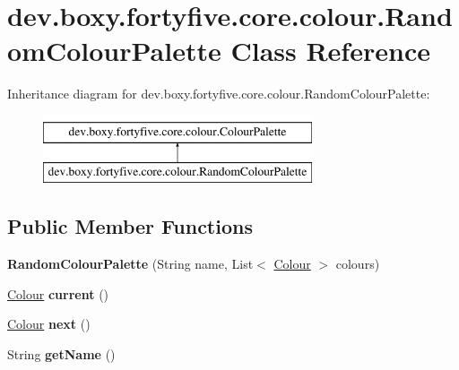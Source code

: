 \hypertarget{classdev_1_1boxy_1_1fortyfive_1_1core_1_1colour_1_1_random_colour_palette}{
\section{dev.boxy.fortyfive.core.colour.RandomColourPalette Class Reference}
\label{df/d90/classdev_1_1boxy_1_1fortyfive_1_1core_1_1colour_1_1_random_colour_palette}
}
Inheritance diagram for dev.boxy.fortyfive.core.colour.RandomColourPalette:\begin{figure}[H]
\begin{center}
\leavevmode
\includegraphics[height=2.000000cm]{df/d90/classdev_1_1boxy_1_1fortyfive_1_1core_1_1colour_1_1_random_colour_palette}
\end{center}
\end{figure}
\subsection*{Public Member Functions}
\begin{DoxyCompactItemize}
\item 
\hypertarget{classdev_1_1boxy_1_1fortyfive_1_1core_1_1colour_1_1_random_colour_palette_a3a5dbec205e17fb9a08843962ed8af50}{
{\bfseries RandomColourPalette} (String name, List$<$ \hyperlink{classdev_1_1boxy_1_1fortyfive_1_1core_1_1colour_1_1_colour}{Colour} $>$ colours)}
\label{df/d90/classdev_1_1boxy_1_1fortyfive_1_1core_1_1colour_1_1_random_colour_palette_a3a5dbec205e17fb9a08843962ed8af50}

\item 
\hypertarget{classdev_1_1boxy_1_1fortyfive_1_1core_1_1colour_1_1_random_colour_palette_a99fb00c74c3168c195447220c54e8192}{
\hyperlink{classdev_1_1boxy_1_1fortyfive_1_1core_1_1colour_1_1_colour}{Colour} {\bfseries current} ()}
\label{df/d90/classdev_1_1boxy_1_1fortyfive_1_1core_1_1colour_1_1_random_colour_palette_a99fb00c74c3168c195447220c54e8192}

\item 
\hypertarget{classdev_1_1boxy_1_1fortyfive_1_1core_1_1colour_1_1_random_colour_palette_ae870f58efcfa63e4bdbee48901e79fbe}{
\hyperlink{classdev_1_1boxy_1_1fortyfive_1_1core_1_1colour_1_1_colour}{Colour} {\bfseries next} ()}
\label{df/d90/classdev_1_1boxy_1_1fortyfive_1_1core_1_1colour_1_1_random_colour_palette_ae870f58efcfa63e4bdbee48901e79fbe}

\item 
\hypertarget{classdev_1_1boxy_1_1fortyfive_1_1core_1_1colour_1_1_random_colour_palette_ae8dc1fa21c7779b8f4a6ccb97adbc7f6}{
String {\bfseries getName} ()}
\label{df/d90/classdev_1_1boxy_1_1fortyfive_1_1core_1_1colour_1_1_random_colour_palette_ae8dc1fa21c7779b8f4a6ccb97adbc7f6}

\end{DoxyCompactItemize}
